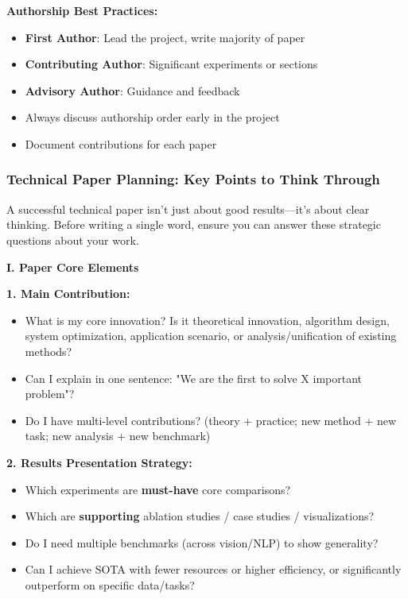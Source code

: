 \documentclass[11pt,a4paper]{article}
\begin{document}
\textbf{Authorship Best Practices:}
\begin{itemize}
    \item \textbf{First Author}: Lead the project, write majority of paper
    \item \textbf{Contributing Author}: Significant experiments or sections
    \item \textbf{Advisory Author}: Guidance and feedback
    \item Always discuss authorship order early in the project
    \item Document contributions for each paper
\end{itemize}

\subsubsection{Technical Paper Planning: Key Points to Think Through}

\begin{tcolorbox}[colback=blue!5,colframe=darkblue,title=Before You Start Writing a Technical Paper]
A successful technical paper isn't just about good results—it's about clear thinking. Before writing a single word, ensure you can answer these strategic questions about your work.
\end{tcolorbox}

\textbf{I. Paper Core Elements}

\textbf{1. Main Contribution:}
\begin{itemize}
    \item What is my core innovation? Is it theoretical innovation, algorithm design, system optimization, application scenario, or analysis/unification of existing methods?
    \item Can I explain in one sentence: "We are the first to solve X important problem"?
    \item Do I have multi-level contributions? (theory + practice; new method + new task; new analysis + new benchmark)
\end{itemize}

\textbf{2. Results Presentation Strategy:}
\begin{itemize}
    \item Which experiments are \textbf{must-have} core comparisons?
    \item Which are \textbf{supporting} ablation studies / case studies / visualizations?
    \item Do I need multiple benchmarks (across vision/NLP) to show generality?
    \item Can I achieve SOTA with fewer resources or higher efficiency, or significantly outperform on specific data/tasks?
\end{itemize}
\end{document}
